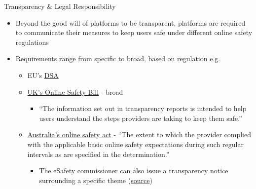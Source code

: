 \documentclass[nobackground,dvipsnames,table]{beamer}
\begin{document}
\begin{frame}{Transparency \& Legal Responsibility}

\small{
\begin{itemize}
    \item Beyond the good will of platforms to be transparent, platforms are required to communicate their measures to keep users safe under different online safety regulations
    \item Requirements range from specific to broad, based on regulation e.g.

    \begin{itemize}
        \item EU’s \href{https://digitalservicesact.cc/dsa/art13.html}{DSA} 
        \item \href{https://bills.parliament.uk/publications/49377/documents/2735}{UK’s Online Safety Bill} - broad

        \begin{itemize}
            \item “The information set out in transparency reports is intended to help users understand the steps providers are taking to keep them safe.”
        \end{itemize}

        \item \href{https://www.legislation.gov.au/Details/C2021A00076}{Australia’s online safety act} - “The extent to which the provider complied with the applicable basic online safety expectations during such regular intervals as are specified in the determination.”

        \begin{itemize}
            \item The eSafety commissioner can also issue a transparency notice surrounding a specific theme (\href{https://www.esafety.gov.au/industry/basic-online-safety-expectations/responses-to-transparency-notices\#:~:text=On\%2029\%20August\%202022\%2C\%20eSafety,Meta}{source})
        \end{itemize}
    \end{itemize}
\end{itemize}
}

\end{frame}
\end{document}
